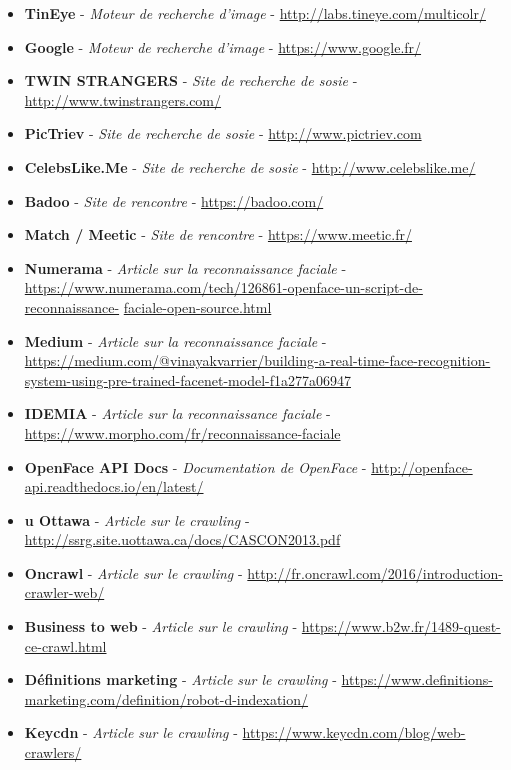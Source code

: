 \documentclass[a4paper,12pt]{article}
\begin{document}
\begin{itemize}
    \item \textbf{TinEye} - \textit{Moteur de recherche d'image} -         \url{http://labs.tineye.com/multicolr/}
    \item \textbf{Google} - \textit{Moteur de recherche d'image} - \url{https://www.google.fr/}
    \item \textbf{TWIN STRANGERS} - \textit{Site de recherche de sosie} - \url{http://www.twinstrangers.com/}
    \item \textbf{PicTriev} - \textit{Site de recherche de sosie} - \url{http://www.pictriev.com}
    \item \textbf{CelebsLike.Me} - \textit{Site de recherche de sosie} - \url{http://www.celebslike.me/}
    \item \textbf{Badoo} - \textit{Site de rencontre} - \url{https://badoo.com/}
    \item \textbf{Match / Meetic} - \textit{Site de rencontre} - \url{https://www.meetic.fr/}
    \item \textbf{Numerama} - \textit{Article sur la reconnaissance faciale} - \url{https://www.numerama.com/tech/126861-openface-un-script-de-reconnaissance-} \url{faciale-open-source.html}
    \item \textbf{Medium} - \textit{Article sur la reconnaissance faciale} - \url{https://medium.com/@vinayakvarrier/building-a-real-time-face-recognition-} \url{system-using-pre-trained-facenet-model-f1a277a06947 }
    \item \textbf{IDEMIA } - \textit{Article sur la reconnaissance faciale } - \url{https://www.morpho.com/fr/reconnaissance-faciale }
    \item \textbf{OpenFace API Docs} - \textit{Documentation de OpenFace} - \url{http://openface-api.readthedocs.io/en/latest/}
    \item \textbf{u Ottawa } - \textit{Article sur le crawling} - \url{http://ssrg.site.uottawa.ca/docs/CASCON2013.pdf }
    \item \textbf{Oncrawl } - \textit{Article sur le crawling } - \url{http://fr.oncrawl.com/2016/introduction-crawler-web/}
    \item \textbf{Business to web } - \textit{Article sur le crawling } - \url{https://www.b2w.fr/1489-quest-ce-crawl.html}
    \item \textbf{Définitions marketing } - \textit{Article sur le crawling } - \url{https://www.definitions-marketing.com/definition/robot-d-indexation/ }
    \item \textbf{Keycdn } - \textit{Article sur le crawling} - \url{https://www.keycdn.com/blog/web-crawlers/}

\end{itemize}
\end{document}
